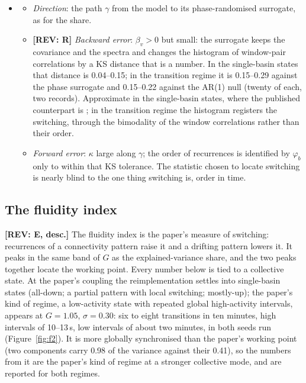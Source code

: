 \documentclass[11pt]{article}
\newcommand{\REV}[1]{\textcolor{purple!70!black}{\textbf{[REV: #1]}}}
\begin{document}
\begin{itemize}
\begin{itemize}
  \item \emph{Forward error}: $\kappa$ large along the stationary direction; along the regime coordinate the field's evidence is thin and divided.
  \end{itemize}
\item[$\Theta_3$]
  \begin{itemize}
  \item \emph{Direction}: the path $\gamma$ from the model to its phase-randomised surrogate, as for the share.
  \item \REV{R} \emph{Backward error}: $\beta_v>0$ but small: the surrogate keeps the covariance and the spectra and changes the histogram of window-pair correlations by a KS distance that is a number. In the single-basin states that distance is 0.04--0.15; in the transition regime it is 0.15--0.29 against the phase surrogate and 0.15--0.22 against the AR(1) null (twenty of each, two records). Approximate in the single-basin states, where the published counterpart is \textcite{liegeois2017}; in the transition regime the histogram registers the switching, through the bimodality of the window correlations rather than their order.
  \item \emph{Forward error}: $\kappa$ large along $\gamma$; the order of recurrences is identified by $\varphi_b$ only to within that KS tolerance. The statistic chosen to locate switching is nearly blind to the one thing switching is, order in time.
  \end{itemize}
\end{itemize}

\subsection{The fluidity index}\label{app:fluid}
\REV{E, desc.} The fluidity index is the paper's measure of switching: recurrences of a connectivity pattern raise it and a drifting pattern lowers it. It peaks in the same band of $G$ as the explained-variance share, and the two peaks together locate the working point. Every number below is tied to a collective state. At the paper's coupling the reimplementation settles into single-basin states (all-down; a partial pattern with local switching; mostly-up); the paper's kind of regime, a low-activity state with repeated global high-activity intervals, appears at $G=1.05$, $\sigma=0.30$: six to eight transitions in ten minutes, high intervals of 10--13\,s, low intervals of about two minutes, in both seeds run (Figure~\ref{fig:f2}). It is more globally synchronised than the paper's working point (two components carry 0.98 of the variance against their 0.41), so the numbers from it are the paper's kind of regime at a stronger collective mode, and are reported for both regimes.
\end{document}
